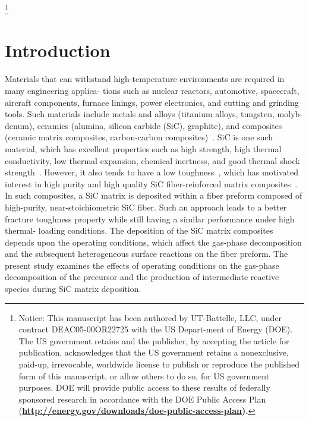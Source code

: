 \documentclass[final, letterpaper, square, comma, numbers, sort&compress]{elsarticle}
\begin{document}
\let\thefootnote\relax\footnote{Notice: This manuscript has been authored by UT-Battelle, LLC, under contract DEAC05-00OR22725 with the US Depart-ment of Energy (DOE). The US government retains and the publisher, by accepting the article for publication, acknowledges that the US government retains a nonexclusive, paid-up, irrevocable, worldwide license to publish or reproduce the published form of this manuscript, or allow others to do so, for US government purposes. DOE will provide public access to these results of federally sponsored research in accordance with the DOE Public Access Plan (\bf \href{http://energy.gov/downloads/doe-public-access-plan}{http://energy.gov/downloads/doe-public-access-plan}).}

\section{Introduction}
\label{S:1}

Materials that can withstand high-temperature environments are required in many engineering applica- tions such as nuclear reactors, automotive, spacecraft, aircraft components, furnace linings, power electronics,
and cutting and grinding tools. Such materials include metals and alloys (titanium alloys, tungsten, molyb- denum), ceramics (alumina, silicon carbide (SiC), graphite), and composites (ceramic matrix composites, carbon-carbon composites)~\cite{Meetham1991,Tressler1999,Belmonte2006,Fahrenholtz2014,BarCohen2014}. SiC is one such material, which has excellent properties such as high strength, high thermal conductivity, low thermal expansion, chemical inertness, and good thermal shock strength~\cite{Levinshtein2001,Hironaka2002,Snead2007,Presser2008}. However, it also tends to have a low toughness~\cite{Padture1994,Mulla1994,Cao1995}, which has motivated interest in high purity and high quality SiC fiber-reinforced matrix composites~\cite{Naslain1995,Prewo1989,Besmann1991,Wang1996,Prouhet1994,Zhu1999,Liu2023}. In such composites, a SiC matrix is deposited within a fiber preform composed of high-purity, near-stoichiometric SiC fiber. Such an approach leads to a better fracture toughness property while still having a similar performance under high thermal- loading conditions. The deposition of the SiC matrix composites depends upon the operating conditions, which affect the gas-phase decomposition and the subsequent heterogeneous surface reactions on the fiber preform. The present study examines the effects of operating conditions on the gas-phase decomposition of the precursor and the production of intermediate reactive species during SiC matrix deposition.
\end{document}
